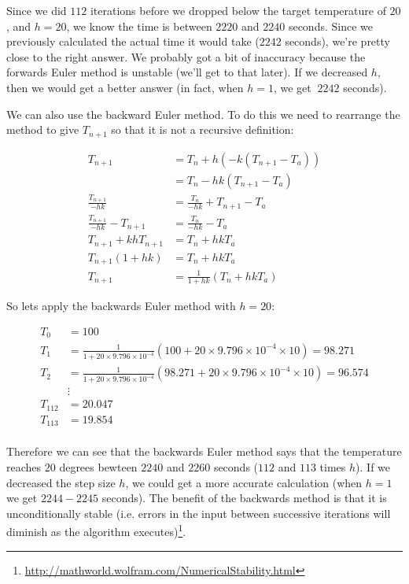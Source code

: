 Since we did $112$ iterations before we dropped below the target
temperature of $20$, and $h = 20$, we know the time is between $2220$
and $2240$ seconds. Since we previously calculated the actual time it
would take ($2242$ seconds), we're pretty close to the right
answer. We probably got a bit of inaccuracy because the forwards Euler
method is unstable (we'll get to that later). If we decreased $h$,
then we would get a better answer (in fact, when $h=1$, we get $~2242$
seconds).

We can also use the backward Euler method. To do this we need to
rearrange the method to give $T_{n+1}$ so that it is not a recursive
definition:

\[
\begin{split}
  T_{n+1} &= T_n + h(-k(T_{n+1} - T_a))\\
          &= T_n - hk(T_{n+1} - T_a)\\
  \frac{T_{n+1}}{-hk} &= \frac{T_n}{-hk} + T_{n+1} - T_a\\
  \frac{T_{n+1}}{-hk} - T_{n+1} &= \frac{T_n}{-hk} - T_a\\
  T_{n+1} + khT_{n+1} &= T_n + hkT_a\\
  T_{n+1}(1 + hk) &= T_n + hkT_a\\
  T_{n+1} &= \frac{1}{1 + hk}(T_n + hkT_a)
  \end{split}
\]

So lets apply the backwards Euler method with $h=20$:

\[
\begin{split}
  T_0 &= 100\\
  T_1 &= \frac{1}{1 + 20\times9.796\times10^{-4}}(100 +
  20\times9.796\times10^{-4}\times10) = 98.271\\
  T_2 &= \frac{1}{1 + 20\times9.796\times10^{-4}}(98.271 +
  20\times9.796\times10^{-4}\times10) = 96.574\\
  &\vdots\\
  T_{112} &= 20.047\\
  T_{113} &= 19.854\\
\end{split}
\]

Therefore we can see that the backwards Euler method says that the
temperature reaches $20$ degrees bewteen $2240$ and $2260$ seconds
($112$ and $113$ times $h$). If we decreased the step size $h$, we
could get a more accurate calculation (when $h=1$ we get $2244-2245$
seconds). The benefit of the backwards method is that it is
unconditionally stable (i.e. errors in the input between successive
iterations will diminish as the algorithm
executes)\footnote{\url{http://mathworld.wolfram.com/NumericalStability.html}}.

